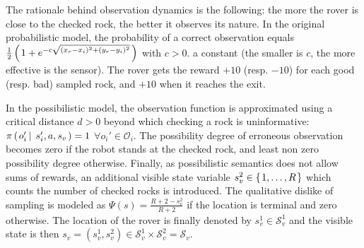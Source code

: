 The rationale behind observation dynamics is the following: 
the more the rover is close to
the checked rock, the better it observes its nature. 
In the original
probabilistic model, 
the probability of a correct observation equals
$\frac{1}{2}\left( \left.  1 + e^{-c \sqrt{(x_r-x_i)^2 + (y_r-y_i)^2} } \right. \right) $ with $c>0$.
 a constant (the smaller is $c$, the more effective is the sensor). 
The rover gets the reward $+10$ (resp. $-10$) for each good (resp. bad) sampled rock, %
and $+10$ when it reaches the exit. 

In the possibilistic model, the observation function is approximated using a
critical distance $d>0$ beyond which checking a rock is uninformative: $\pi
\left( \left.  o_i' \, \right| \left. \, s_i',a,s_v  \right. \right) = 1$ $ \forall o_i' \in \mathcal{O}_{i} $.
The possibility degree of
erroneous observation becomes zero if the robot stands at
the checked rock, and least non zero possibility degree otherwise. Finally, 
as possibilistic semantics does not allow sums of
rewards, an additional visible state variable $s^2_v \in
\left\{ \left.  1, \ldots, R  \right. \right\}$ which counts the number of checked rocks is introduced. 
The qualitative dislike of sampling is modeled as $\Psi(s)=\frac{R+2-s_{v}^{2}}{R+2}$
if the location is terminal and zero otherwise. 
The location of the rover is finally denoted by $s^1_v \in \mathcal{S}^1_v$ and the visible state is then
$s_v=(s^1_v,s^2_v) \in \mathcal{S}^1_v \times \mathcal{S}^2_v = \mathcal{S}_v$. 

